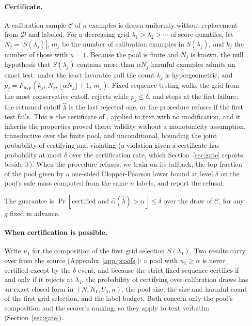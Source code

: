\documentclass{article} %
\newcommand{\pool}{\mathcal{D}}
\newcommand{\calset}{\mathcal{C}}
\newcommand{\sel}[1]{S(#1)}
\newcommand{\ahat}{\hat\alpha}
\begin{document}
\paragraph{Certificate.} A calibration sample $\calset$ of $n$ examples is drawn uniformly without replacement from $\pool$ and labeled. For a decreasing grid $\lambda_1 > \lambda_2 > \cdots$ of score quantiles, let $N_j = |\sel{\lambda_j}|$, $m_j$ be the number of calibration examples in $\sel{\lambda_j}$, and $k_j$ the number of those with $u = 1$. Because the pool is finite and $N_j$ is known, the null hypothesis that $\sel{\lambda_j}$ contains more than $\alpha N_j$ harmful examples admits an exact test: under the least favorable null the count $k_j$ is hypergeometric, and $p_j = F_{\mathrm{hyp}}(k_j;\, N_j,\, \lfloor \alpha N_j \rfloor + 1,\, m_j)$. Fixed-sequence testing walks the grid from the most conservative cutoff, rejects while $p_j \le \delta$, and stops at the first failure; the returned cutoff $\hat\lambda$ is the last rejected one, or the procedure refuses if the first test fails. This is the certificate of \citet{haroon2026certified}, applied to text with no modification, and it inherits the properties proved there: validity without a monotonicity assumption, transductive over the finite pool, and unconditional, bounding the joint probability of certifying and violating (a violation given a certificate has probability at most $\delta$ over the certification rate, which Section~\ref{sec:gate} reports beside it). When the procedure refuses, we train on its fallback, the top fraction of the pool given by a one-sided Clopper-Pearson lower bound at level $\delta$ on the pool's safe mass computed from the same $n$ labels, and report the refusal.

The guarantee is $\Pr[\text{certified and } \ahat(\hat\lambda) > \alpha] \le \delta$ over the draw of $\calset$, for any $g$ fixed in advance.

\paragraph{When certification is possible.} Write $u_1$ for the composition of the first grid selection $\sel{\lambda_1}$. Two results carry over from the source (Appendix~\ref{app:proofs}): a pool with $u_1 \ge \alpha$ is never certified except by the $\delta$-event, and because the strict fixed sequence certifies if and only if it rejects at $\lambda_1$, the probability of certifying over calibration draws has an exact closed form in $(N, N_1, U_1, n)$, the pool size, the size and harmful count of the first grid selection, and the label budget. Both concern only the pool's composition and the scorer's ranking, so they apply to text verbatim (Section~\ref{sec:gate}).
\end{document}
